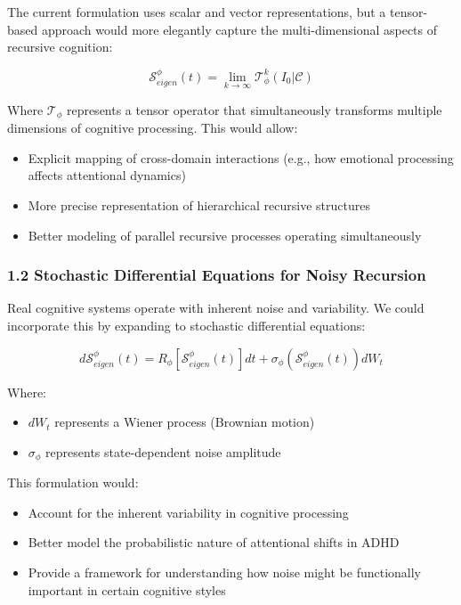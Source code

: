 \documentclass[
]{article}
\providecommand{\tightlist}{%
  \setlength{\itemsep}{0pt}\setlength{\parskip}{0pt}}
\begin{document}
The current formulation uses scalar and vector representations, but a
tensor-based approach would more elegantly capture the multi-dimensional
aspects of recursive cognition:

\[\mathcal{S}_{eigen}^{\phi}(t) = \lim_{k \to \infty} \mathcal{T}^k_{\phi}(I_0 | \mathcal{C})\]

Where \(\mathcal{T}_{\phi}\) represents a tensor operator that
simultaneously transforms multiple dimensions of cognitive processing.
This would allow:

\begin{itemize}
\tightlist
\item
  Explicit mapping of cross-domain interactions (e.g., how emotional
  processing affects attentional dynamics)
\item
  More precise representation of hierarchical recursive structures
\item
  Better modeling of parallel recursive processes operating
  simultaneously
\end{itemize}

\subsubsection{1.2 Stochastic Differential Equations for Noisy
Recursion}\label{stochastic-differential-equations-for-noisy-recursion}

Real cognitive systems operate with inherent noise and variability. We
could incorporate this by expanding to stochastic differential
equations:

\[d\mathcal{S}_{eigen}^{\phi}(t) = R_{\phi}[\mathcal{S}_{eigen}^{\phi}(t)]dt + \sigma_{\phi}(\mathcal{S}_{eigen}^{\phi}(t))dW_t\]

Where:

\begin{itemize}
\tightlist
\item
  \(dW_t\) represents a Wiener process (Brownian motion)
\item
  \(\sigma_{\phi}\) represents state-dependent noise amplitude
\end{itemize}

This formulation would:

\begin{itemize}
\tightlist
\item
  Account for the inherent variability in cognitive processing
\item
  Better model the probabilistic nature of attentional shifts in ADHD
\item
  Provide a framework for understanding how noise might be functionally
  important in certain cognitive styles
\end{itemize}
\end{document}
